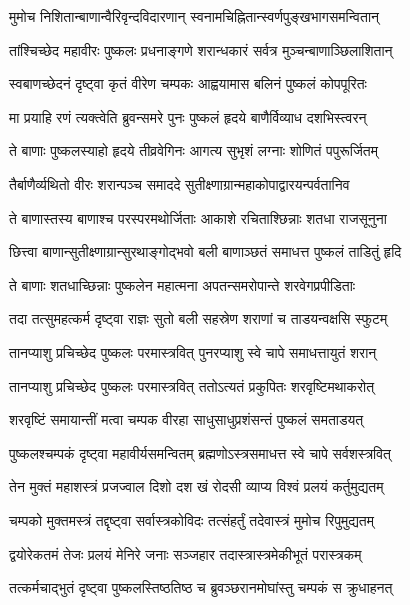 \twolineshloka
{मुमोच निशितान्बाणान्वैरिवृन्दविदारणान्}
{स्वनामचिह्नितान्स्वर्णपुङ्खभागसमन्वितान्}%

\twolineshloka
{तांश्चिच्छेद महावीरः पुष्कलः प्रधनाङ्गणे}
{शरान्धकारं सर्वत्र मुञ्चन्बाणाञ्छिलाशितान्}%

\twolineshloka
{स्वबाणच्छेदनं दृष्ट्वा कृतं वीरेण चम्पकः}
{आह्वयामास बलिनं पुष्कलं कोपपूरितः}%

\twolineshloka
{मा प्रयाहि रणं त्यक्त्वेति ब्रुवन्समरे पुनः}
{पुष्कलं हृदये बाणैर्विव्याध दशभिस्त्वरन्}%

\twolineshloka
{ते बाणाः पुष्कलस्याहो हृदये तीव्रवेगिनः}
{आगत्य सुभृशं लग्नाः शोणितं पपुरूर्जितम्}%

\twolineshloka
{तैर्बाणैर्व्यथितो वीरः शरान्पञ्च समाददे}
{सुतीक्ष्णाग्रान्महाकोपाद्वारयन्पर्वतानिव}%

\twolineshloka
{ते बाणास्तस्य बाणाश्च परस्परमथोर्जिताः}
{आकाशे रचिताश्छिन्नाः शतधा राजसूनुना}%

\twolineshloka
{छित्त्वा बाणान्सुतीक्ष्णाग्रान्सुरथाङ्गोद्भवो बली}
{बाणाञ्छतं समाधत्त पुष्कलं ताडितुं हृदि}%

\twolineshloka
{ते बाणाः शतधाच्छिन्नाः पुष्कलेन महात्मना}
{अपतन्समरोपान्ते शरवेगप्रपीडिताः}%

\twolineshloka
{तदा तत्सुमहत्कर्म दृष्ट्वा राज्ञः सुतो बली}
{सहस्रेण शराणां च ताडयन्वक्षसि स्फुटम्}%

\twolineshloka
{तानप्याशु प्रचिच्छेद पुष्कलः परमास्त्रवित्}
{पुनरप्याशु स्वे चापे समाधत्तायुतं शरान्}%

\twolineshloka
{तानप्याशु प्रचिच्छेद पुष्कलः परमास्त्रवित्}
{ततोऽत्यतं प्रकुपितः शरवृष्टिमथाकरोत्}%

\twolineshloka
{शरवृष्टिं समायान्तीं मत्वा चम्पक वीरहा}
{साधुसाधुप्रशंसन्तं पुष्कलं समताडयत्}%

\twolineshloka
{पुष्कलश्चम्पकं दृष्ट्वा महावीर्यसमन्वितम्}
{ब्रह्मणोऽस्त्रसमाधत्त स्वे चापे सर्वशस्त्रवित्}%

\twolineshloka
{तेन मुक्तं महाशस्त्रं प्रजज्वाल दिशो दश}
{खं रोदसी व्याप्य विश्वं प्रलयं कर्तुमुद्यतम्}%

\twolineshloka
{चम्पको मुक्तमस्त्रं तद्दृष्ट्वा सर्वास्त्रकोविदः}
{तत्संहर्तुं तदेवास्त्रं मुमोच रिपुमुद्यतम्}%

\twolineshloka
{द्वयोरेकतमं तेजः प्रलयं मेनिरे जनाः}
{सञ्जहार तदास्त्रास्त्रमेकीभूतं परास्त्रकम्}%

\twolineshloka
{तत्कर्मचाद्भुतं दृष्ट्वा पुष्कलस्तिष्ठतिष्ठ च}
{ब्रुवञ्छरानमोघांस्तु चम्पकं स क्रुधाहनत्}%

